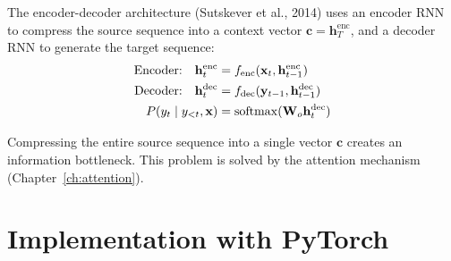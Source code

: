 \begin{definition}
The encoder-decoder architecture (Sutskever et al., 2014) uses an encoder RNN
to compress the source sequence into a context vector
$\mathbf{c} = \mathbf{h}_T^{\text{enc}}$, and a decoder RNN to generate the
target sequence:
\begin{align}
\text{Encoder:} \quad \mathbf{h}_t^{\text{enc}} &= f_{\text{enc}}(\mathbf{x}_t, \mathbf{h}_{t-1}^{\text{enc}}) \\
\text{Decoder:} \quad \mathbf{h}_t^{\text{dec}} &= f_{\text{dec}}(\mathbf{y}_{t-1}, \mathbf{h}_{t-1}^{\text{dec}}) \\
P(y_t \mid y_{<t}, \mathbf{x}) &= \operatorname{softmax}(\mathbf{W}_o \mathbf{h}_t^{\text{dec}})
\end{align}
\end{definition}

\begin{warning}[title=\textbf{Information bottleneck}]
Compressing the entire source sequence into a single vector $\mathbf{c}$
creates an information bottleneck. This problem is solved by the attention
mechanism (Chapter~\ref{ch:attention}).
\end{warning}

\section{Implementation with PyTorch}
\label{sec:seq:implementation}

